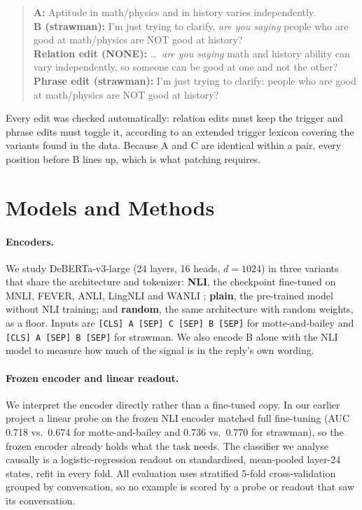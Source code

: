 \documentclass[11pt]{article}
\begin{document}
\begin{small}
\begin{quote}
\textbf{A:} Aptitude in math/physics and in history varies independently.\\
\textbf{B (strawman):} I'm just trying to clarify, \textit{are you saying} people who are good at math/physics are NOT good at history?\\
\textbf{Relation edit (NONE):} \ldots\ \textit{are you saying} math and history ability can vary independently, so someone can be good at one and not the other?\\
\textbf{Phrase edit (strawman):} I'm just trying to clarify: people who are good at math/physics are NOT good at history?
\end{quote}
\end{small}

\noindent Every edit was checked automatically: relation edits must keep the trigger and phrase edits must toggle it, according to an extended trigger lexicon covering the variants found in the data. Because A and C are identical within a pair, every position before B lines up, which is what patching requires.

\section{Models and Methods}

\paragraph{Encoders.} We study DeBERTa-v3-large \citep{he2023debertav3} (24 layers, 16 heads, $d=1024$) in three variants that share the architecture and tokenizer: \textbf{NLI}, the checkpoint fine-tuned on MNLI, FEVER, ANLI, LingNLI and WANLI \citep{laurer2024less}; \textbf{plain}, the pre-trained model without NLI training; and \textbf{random}, the same architecture with random weights, as a floor. Inputs are \texttt{[CLS] A [SEP] C [SEP] B [SEP]} for motte-and-bailey and \texttt{[CLS] A [SEP] B [SEP]} for strawman. We also encode B alone with the NLI model to measure how much of the signal is in the reply's own wording.

\paragraph{Frozen encoder and linear readout.} We interpret the encoder directly rather than a fine-tuned copy. In our earlier project a linear probe on the frozen NLI encoder matched full fine-tuning (AUC 0.718 vs.\ 0.674 for motte-and-bailey and 0.736 vs.\ 0.770 for strawman), so the frozen encoder already holds what the task needs. The classifier we analyse causally is a logistic-regression readout on standardised, mean-pooled layer-24 states, refit in every fold. All evaluation uses stratified 5-fold cross-validation grouped by conversation, so no example is scored by a probe or readout that saw its conversation.
\end{document}

